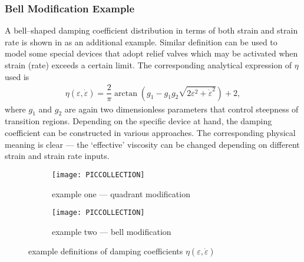 \subsubsection{Bell Modification Example}
A bell--shaped damping coefficient distribution in terms of both strain and strain rate is shown in  as an additional example. Similar definition can be used to model some special devices that adopt relief valves which may be activated when strain (rate) exceeds a certain limit. The corresponding analytical expression of $\eta$ used is
\begin{gather}
\eta\left(\varepsilon,\dot\varepsilon\right)=\dfrac{2}{\pi}\arctan\left(g_1-g_1g_2\sqrt{2\varepsilon^2+\dot\varepsilon^2}\right)+2,
\end{gather}
where $g_1$ and $g_2$ are again two dimensionless parameters that control steepness of transition regions. Depending on the specific device at hand, the damping coefficient can be constructed in various approaches. The corresponding physical meaning is clear --- the `effective' viscosity can be changed depending on different strain and strain rate inputs.
\begin{figure}[hbt]
\scriptsize\centering
\begin{subfigure}[b]{.49\textwidth}\centering
\texttt{[image: PICCOLLECTION]}
\caption{example one --- quadrant modification}\label{fig:eta_example1}
\end{subfigure}\hfill
\begin{subfigure}[b]{.49\textwidth}\centering
\texttt{[image: PICCOLLECTION]}
\caption{example two --- bell modification}\label{fig:eta_example2}
\end{subfigure}
\caption{example definitions of damping coefficients $\eta\left(\varepsilon,\dot\varepsilon\right)$}\label{fig:eta_example}
\end{figure}

